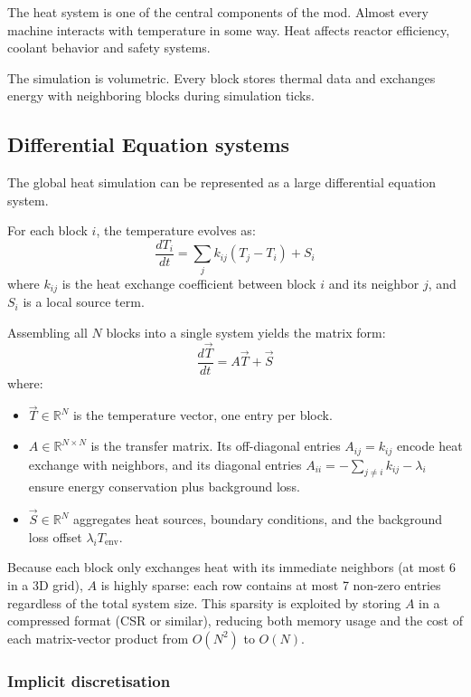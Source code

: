 \documentclass{report}
\begin{document}
The heat system is one of the central components of the mod. Almost every machine interacts with temperature in some way. Heat affects reactor efficiency, coolant behavior and safety systems.

The simulation is volumetric. Every block stores thermal data and exchanges energy with neighboring blocks during simulation ticks.

\subsection{Differential Equation systems}

The global heat simulation can be represented as a large differential equation system.

For each block $i$, the temperature evolves as:
\[
\frac{dT_i}{dt} = \sum_j k_{ij}(T_j - T_i) + S_i
\]
where $k_{ij}$ is the heat exchange coefficient between block $i$ and its neighbor $j$, and $S_i$ is a local source term.

Assembling all $N$ blocks into a single system yields the matrix form:
\[
\frac{d\vec{T}}{dt} = A\vec{T} + \vec{S}
\]
where:
\begin{itemize}
    \item $\vec{T} \in \mathbb{R}^N$ is the temperature vector, one entry per block.
    \item $A \in \mathbb{R}^{N \times N}$ is the transfer matrix. Its off-diagonal entries $A_{ij} = k_{ij}$ encode
          heat exchange with neighbors, and its diagonal entries $A_{ii} = -\sum_{j \neq i} k_{ij} - \lambda_i$
          ensure energy conservation plus background loss.
    \item $\vec{S} \in \mathbb{R}^N$ aggregates heat sources, boundary conditions, and the background loss offset
          $\lambda_i T_{\text{env}}$.
\end{itemize}

Because each block only exchanges heat with its immediate neighbors (at most 6 in a 3D grid),
$A$ is highly sparse: each row contains at most 7 non-zero entries regardless of the total
system size. This sparsity is exploited by storing $A$ in a compressed format (CSR or similar),
reducing both memory usage and the cost of each matrix-vector product from $O(N^2)$ to $O(N)$.

\subsubsection*{Implicit discretisation}
\end{document}
